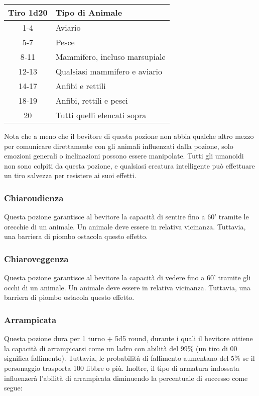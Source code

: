 \documentclass{article}
\begin{document}
\begin{multicols}{2}
\begin{table}[h]
\centering
\begin{tabular}{|c|l|}
\hline
\textbf{Tiro 1d20} & \textbf{Tipo di Animale} \\
\hline
1-4 & Aviario \\
5-7 & Pesce \\
8-11 & Mammifero, incluso marsupiale \\
12-13 & Qualsiasi mammifero e aviario \\
14-17 & Anfibi e rettili \\
18-19 & Anfibi, rettili e pesci \\
20 & Tutti quelli elencati sopra \\
\hline
\end{tabular}

\end{table}

Nota che a meno che il bevitore di questa pozione non abbia qualche altro mezzo per comunicare direttamente con gli animali influenzati dalla pozione, solo emozioni generali o inclinazioni possono essere manipolate. Tutti gli umanoidi non sono colpiti da questa pozione, e qualsiasi creatura intelligente può effettuare un tiro salvezza per resistere ai suoi effetti.

\subsubsection{Chiaroudienza}
Questa pozione garantisce al bevitore la capacità di sentire fino a 60' tramite le orecchie di un animale. Un animale deve essere in relativa vicinanza. Tuttavia, una barriera di piombo ostacola questo effetto.

\subsubsection{Chiaroveggenza}
Questa pozione garantisce al bevitore la capacità di vedere fino a 60' tramite gli occhi di un animale. Un animale deve essere in relativa vicinanza. Tuttavia, una barriera di piombo ostacola questo effetto.

\subsubsection{Arrampicata}
Questa pozione dura per 1 turno + 5d5 round, durante i quali il bevitore ottiene la capacità di arrampicarsi come un ladro con abilità del 99\% (un tiro di 00 significa fallimento). Tuttavia, le probabilità di fallimento aumentano del 5\% se il personaggio trasporta 100 libbre o più. Inoltre, il tipo di armatura indossata influenzerà l'abilità di arrampicata diminuendo la percentuale di successo come segue:


\end{multicols}
\end{document}
